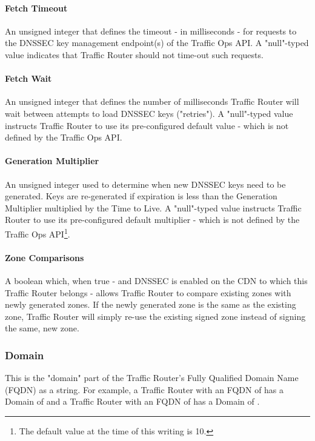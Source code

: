 \paragraph{Fetch Timeout}
An unsigned integer that defines the timeout - in milliseconds - for requests to
the DNSSEC key management endpoint(s) of the Traffic Ops API. A "null"-typed
value indicates that Traffic Router should not time-out such requests.

\paragraph{Fetch Wait}
An unsigned integer that defines the number of milliseconds Traffic Router will
wait between attempts to load DNSSEC keys ("retries"). A "null"-typed value
instructs Traffic Router to use its pre-configured default value - which is not
defined by the Traffic Ops API.

\paragraph{Generation Multiplier}
An unsigned integer used to determine when new DNSSEC keys need to be generated.
Keys are re-generated if expiration is less than the Generation Multiplier
multiplied by the Time to Live. A "null"-typed value instructs Traffic Router to
use its pre-configured default multiplier - which is not defined by the Traffic
Ops API\footnote{The default value at the time of this writing is 10.}.

\paragraph{Zone Comparisons}
A boolean which, when true - and DNSSEC is enabled on the CDN to which this
Traffic Router belongs - allows Traffic Router to compare existing zones with
newly generated zones. If the newly generated zone is the same as the existing
zone, Traffic Router will simply re-use the existing signed zone instead of
signing the same, new zone.

\subsubsection{Domain}
This is the "domain" part of the Traffic Router's Fully Qualified Domain Name
(FQDN) as a string. For example, a Traffic Router with an FQDN of
 has a Domain of  and a Traffic Router with an FQDN
of  has a Domain of .

